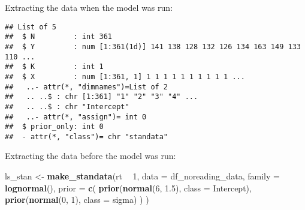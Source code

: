 \documentclass[12pt,ignorenonframetext,aspectratio=169]{beamer}
\newenvironment{Shaded}{\begin{snugshade}}{\end{snugshade}}
\newcommand{\DataTypeTok}[1]{\textcolor[rgb]{0.13,0.29,0.53}{#1}}
\newcommand{\DecValTok}[1]{\textcolor[rgb]{0.00,0.00,0.81}{#1}}
\newcommand{\FloatTok}[1]{\textcolor[rgb]{0.00,0.00,0.81}{#1}}
\newcommand{\KeywordTok}[1]{\textcolor[rgb]{0.13,0.29,0.53}{\textbf{#1}}}
\newcommand{\NormalTok}[1]{#1}
\newcommand{\OperatorTok}[1]{\textcolor[rgb]{0.81,0.36,0.00}{\textbf{#1}}}
\newcommand{\StringTok}[1]{\textcolor[rgb]{0.31,0.60,0.02}{#1}}
\begin{document}
\begin{frame}[fragile]

\begin{block}{Extracting the data when the model was run:}

\vspace{.5cm}

\scriptsize

\begin{Shaded}
\end{Shaded}

\begin{verbatim}
## List of 5
##  $ N         : int 361
##  $ Y         : num [1:361(1d)] 141 138 128 132 126 134 163 149 133 110 ...
##  $ K         : int 1
##  $ X         : num [1:361, 1] 1 1 1 1 1 1 1 1 1 1 ...
##   ..- attr(*, "dimnames")=List of 2
##   .. ..$ : chr [1:361] "1" "2" "3" "4" ...
##   .. ..$ : chr "Intercept"
##   ..- attr(*, "assign")= int 0
##  $ prior_only: int 0
##  - attr(*, "class")= chr "standata"
\end{verbatim}

\normalsize

\end{block}

\end{frame}

\begin{frame}[fragile]

\begin{block}{Extracting the data before the model was run:}

\vspace{1cm}

\scriptsize

\begin{Shaded}
\begin{Highlighting}[]
\NormalTok{ls_stan <-}\StringTok{ }\KeywordTok{make_standata}\NormalTok{(rt }\OperatorTok{~}\StringTok{ }\DecValTok{1}\NormalTok{,}
  \DataTypeTok{data =}\NormalTok{ df_noreading_data,}
  \DataTypeTok{family =} \KeywordTok{lognormal}\NormalTok{(),}
  \DataTypeTok{prior =} \KeywordTok{c}\NormalTok{(}
    \KeywordTok{prior}\NormalTok{(}\KeywordTok{normal}\NormalTok{(}\DecValTok{6}\NormalTok{, }\FloatTok{1.5}\NormalTok{), }\DataTypeTok{class =}\NormalTok{ Intercept),}
    \KeywordTok{prior}\NormalTok{(}\KeywordTok{normal}\NormalTok{(}\DecValTok{0}\NormalTok{, }\DecValTok{1}\NormalTok{), }\DataTypeTok{class =}\NormalTok{ sigma)}
\NormalTok{  )}
\NormalTok{)}
\end{Highlighting}
\end{Shaded}

\normalsize

\end{block}

\end{frame}
\end{document}
